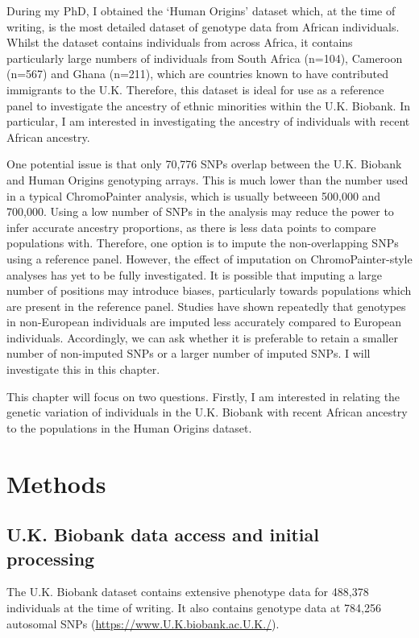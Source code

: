 During my PhD, I obtained the `Human Origins' dataset which, at the time of writing, is the most detailed dataset of genotype data from African individuals. Whilst the dataset contains individuals from across Africa, it contains particularly large numbers of individuals from South Africa (n=104), Cameroon (n=567) and Ghana (n=211), which are countries known to have contributed immigrants to the U.K. Therefore, this dataset is ideal for use as a reference panel to investigate the ancestry of ethnic minorities within the U.K. Biobank. In particular, I am interested in investigating the ancestry of individuals with recent African ancestry. 

One potential issue is that only 70,776 SNPs overlap between the U.K. Biobank and Human Origins genotyping arrays. This is much lower than the number used in a typical ChromoPainter analysis, which is usually betweeen 500,000 and 700,000. Using a low number of SNPs in the analysis may reduce the power to infer accurate ancestry proportions, as there is less data points to compare populations with. Therefore, one option is to impute the non-overlapping SNPs using a reference panel. However, the effect of imputation on ChromoPainter-style analyses has yet to be fully investigated. It is possible that imputing a large number of positions may introduce biases, particularly towards populations which are present in the reference panel. Studies have shown repeatedly that genotypes in non-European individuals are imputed less accurately compared to European individuals. Accordingly, we can ask whether it is preferable to retain a smaller number of non-imputed SNPs or a larger number of imputed SNPs. I will investigate this in this chapter. 

This chapter will focus on two questions. Firstly, I am interested in relating the genetic variation of individuals in the U.K. Biobank with recent African ancestry to the populations in the Human Origins dataset. 


\section{Methods}

\subsection{U.K. Biobank data access and initial processing}

The U.K. Biobank dataset contains extensive phenotype data for 488,378 individuals at the time of writing. It also contains genotype data at 784,256 autosomal SNPs (\url{https://www.U.K.biobank.ac.U.K./}).

